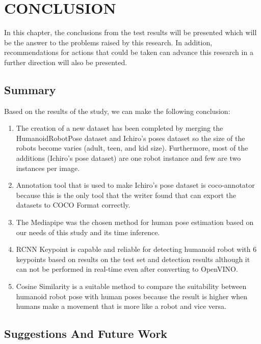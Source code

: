 \chapter{CONCLUSION}
\label{chap:conclusion}

In this chapter, the conclusions from the test results will be presented which will be the answer to the problems raised by this research.
In addition, recommendations for actions that could be taken can advance this research in a further direction will also be presented.

\section{Summary}
\label{sec:summary}

Based on the results of the study, we can make the following conclusion:

\begin{enumerate}[nolistsep]

  \item The creation of a new dataset has been completed by merging the HumanoidRobotPose dataset and Ichiro's poses dataset 
        so the size of the robots become varies (adult, teen, and kid size). Furthermore, most of the additions (Ichiro's pose dataset) are one robot instance and few are two instances per image.
  \item Annotation tool that is used to make Ichiro's pose dataset is coco-annotator because this is the only tool that the writer found that can export the datasets to COCO Format correctly.
  \item The Mediapipe was the chosen method for human pose estimation based on our needs of this study and its time inference.
  \item RCNN Keypoint is capable and reliable for detecting humanoid robot with 6 keypoints  based on results on the test set and detection results
        although it can not be performed in real-time even after converting to OpenVINO.
  \item Cosine Similarity is a suitable method to compare the suitability between humanoid robot pose with human poses because the result is higher when
        humans make a movement that is more like a robot and vice versa.

\end{enumerate}

\section{Suggestions And Future Work}
\label{chap:suggestionsandfuturework}

